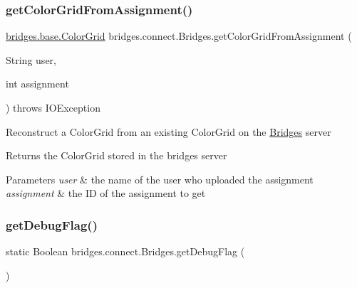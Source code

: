\subsubsection{\texorpdfstring{getColorGridFromAssignment()}{getColorGridFromAssignment()}\hspace{0.1cm}{\footnotesize\ttfamily [2/2]}}
{\footnotesize\ttfamily \mbox{\hyperlink{classbridges_1_1base_1_1_color_grid}{bridges.\+base.\+Color\+Grid}} bridges.\+connect.\+Bridges.\+get\+Color\+Grid\+From\+Assignment (\begin{DoxyParamCaption}\item[{String}]{user,  }\item[{int}]{assignment }\end{DoxyParamCaption}) throws I\+O\+Exception}

Reconstruct a Color\+Grid from an existing Color\+Grid on the \mbox{\hyperlink{classbridges_1_1connect_1_1_bridges}{Bridges}} server

\begin{DoxyReturn}{Returns}
the Color\+Grid stored in the bridges server 
\end{DoxyReturn}

\begin{DoxyParams}{Parameters}
{\em user} & the name of the user who uploaded the assignment \\
\hline
{\em assignment} & the ID of the assignment to get \\
\hline
\end{DoxyParams}
\mbox{\label{classbridges_1_1connect_1_1_bridges_a5c9fa0dd62084bfd916c8bdecee3f517}} 
\subsubsection{\texorpdfstring{getDebugFlag()}{getDebugFlag()}}
{\footnotesize\ttfamily static Boolean bridges.\+connect.\+Bridges.\+get\+Debug\+Flag (\begin{DoxyParamCaption}{ }\end{DoxyParamCaption})\hspace{0.3cm}{\ttfamily [static]}}

\mbox{\label{classbridges_1_1connect_1_1_bridges_a58bef23cd12872c6ae5d7358b7485a2b}} 
